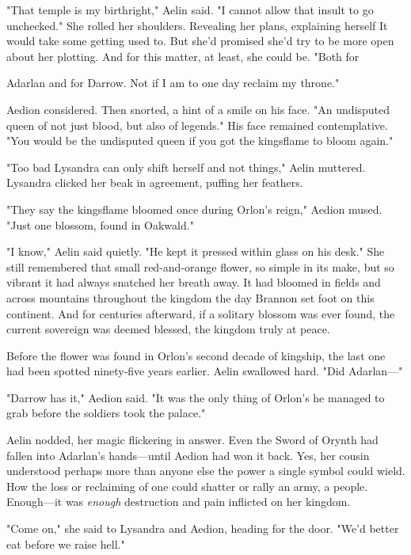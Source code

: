 "That temple is my birthright," Aelin said. "I cannot allow that insult to go unchecked." She rolled her shoulders. Revealing her plans, explaining herself  It would take some getting used to. But she'd promised she'd try to be more  open about her plotting. And for this matter, at least, she could be. "Both for

Adarlan and for Darrow. Not if I am to one day reclaim my throne."

Aedion considered. Then snorted, a hint of a smile on his face. "An undisputed queen of not just blood, but also of legends." His face remained contemplative. "You would be the undisputed queen if you got the kingsflame to bloom again."

"Too bad Lysandra can only shift herself and not things," Aelin muttered. Lysandra clicked her beak in agreement, puffing her feathers.

"They say the kingsflame bloomed once during Orlon's reign," Aedion mused. "Just one blossom, found in Oakwald."

"I know," Aelin said quietly. "He kept it pressed within glass on his desk." She still remembered that small red-and-orange flower, so simple in its make, but so vibrant it had always snatched her breath away. It had bloomed in fields and across mountains throughout the kingdom the day Brannon set foot on this continent. And for centuries afterward, if a solitary blossom was ever found, the current sovereign was deemed blessed, the kingdom truly at peace.

Before the flower was found in Orlon's second decade of kingship, the last one had been spotted ninety-five years earlier. Aelin swallowed hard. "Did Adarlan---"

"Darrow has it," Aedion said. "It was the only thing of Orlon's he managed to grab before the soldiers took the palace."

Aelin nodded, her magic flickering in answer. Even the Sword of Orynth had fallen into Adarlan's hands---until Aedion had won it back. Yes, her cousin understood perhaps more than anyone else the power a single symbol could wield. How the loss or reclaiming of one could shatter or rally an army, a people. Enough---it was \emph{enough} destruction and pain inflicted on her kingdom.

"Come on," she said to Lysandra and Aedion, heading for the door. "We'd better eat before we raise hell."

